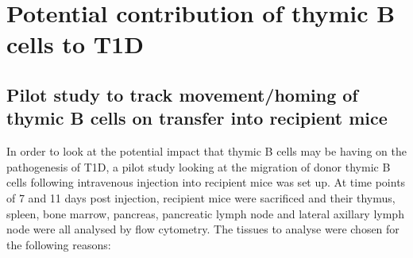 \section{Potential contribution of thymic B cells to T1D}

\subsection{Pilot study to track movement/homing of thymic B cells on transfer into recipient mice}
In order to look at the potential impact that thymic B cells may be having on the pathogenesis of T1D, a pilot study looking at the migration of donor thymic B cells following intravenous injection into recipient mice was set up. 
At time points of 7 and 11 days post injection, recipient mice were sacrificed and their thymus, spleen, bone marrow, pancreas, pancreatic lymph node and lateral axillary lymph node were all analysed by flow cytometry.
The tissues to analyse were chosen for the following reasons:
